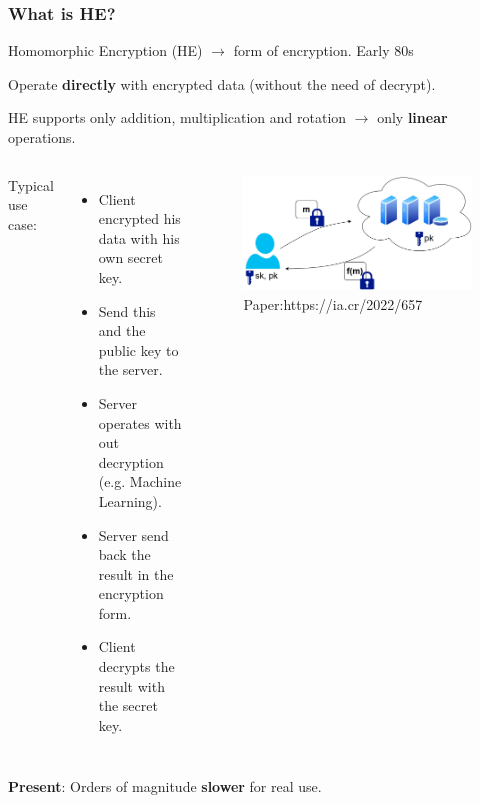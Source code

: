 \documentclass[10pt]{beamer}
\begin{document}
\begin{frame}
\frametitle{What is HE?}

    Homomorphic Encryption (HE) $\rightarrow$ form of encryption. Early 80s
\vspace{-0.3cm}

    Operate \textbf{directly} with encrypted data (without the need of decrypt).
\vspace{-0.3cm}

    HE supports only addition, multiplication and rotation $\rightarrow$ only \textbf{linear} operations.
\vspace{0.3cm}
  \begin{columns}
Typical use case:
\begin{itemize}
    \item Client encrypted his data with his own secret key.
    \item Send this and the public key to the server.
    \item Server operates with out decryption (e.g. Machine Learning).
    \item Server send back the result in the encryption form.
    \item Client decrypts the result with the secret key.
\end{itemize}



\begin{figure}[h!]
    \centering
    \includegraphics[scale=0.1]{fhe.jpg}
    \caption{Paper:https://ia.cr/2022/657}
\end{figure}
\end{columns}
 \vspace{-0.3cm}



 \pause
    \textbf{Present}: Orders of magnitude \textbf{slower} for real use.


\end{frame}
\end{document}
